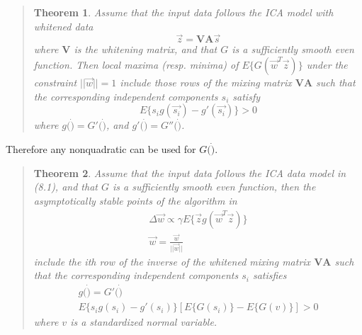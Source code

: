 \documentclass[12pt ]{article}
\newtheorem{thm}{Theorem}[section]
\begin{document}
\begin{quote}
	\begin{thm}
		Assume that the input data follows the ICA model with whitened data
			\begin{equation}
			\vec{z} = \mathbf{V A} \vec{s}
			\end{equation}
			where $\mathbf{V}$ is the whitening matrix, and that $G$ is a sufficiently smooth even function.  Then local maxima (resp. minima) of $E\{G(\vec{w}^T \vec{z}) \}$ under the constraint $||\vec{w}|| =1$ include those rows of the mixing matrix $\mathbf{V A}$ such that the corresponding independent components $s_i$ satisfy
			\begin{equation}
				E \{s_i g(\vec{s_i}) - g'(\vec{s_i}) \} > 0
			\end{equation}
			where $g(\dot) = G'(\dot)$, and $g'(\dot) = G''(\dot)$.
	\end{thm}
	\cite[187]{appo-ica-book}
\end{quote}
Therefore any nonquadratic can be used for $G(\dot)$.

\begin{quote}
	\begin{thm}
		Assume that the input data follows the ICA data model in (8.1), and that $G$ is a sufficiently smooth even function, then the asymptotically stable points of the algorithm in 
		\begin{eqnarray}
		\Delta \vec{w} \propto \gamma E\{ \vec{z}g(\vec{w}^T \vec{z}) \} \\
		\vec{w} = \frac{\vec{w}}{||\vec{w}||} 
		\end{eqnarray}
		include the ith row of the inverse of the whitened mixing matrix $\mathbf{V A}$ such that the corresponding independent components $s_i$ satisfies 
		\begin{eqnarray}
			g(\dot) = G'(\dot) \\
			E \{ s_i g(s_i) - g'(s_i) \} [ E \{ G(s_i) \} - E\{ G(v)\}] > 0
		\end{eqnarray}
		where $v$ is a standardized normal variable.
	\end{thm}
	\cite[187]{appo-ica-book}
\end{quote}


\end{document}
